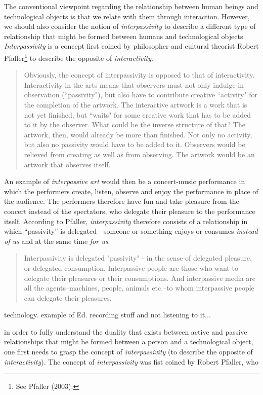The conventional viewpoint regarding the relationship between human beings and technological objects is that we relate with them through interaction. However, we should also consider the notion of \emph{interpassivity} to describe a different type of relationship that might be formed between humans and technological objects. \emph{Interpassivity} is a concept first coined by philosopher and cultural theorist Robert Pfaller\footnote{See Pfaller (2003).} to describe the opposite of \emph{interactivity}.
\begin{quote}
Obviously, the concept of interpassivity is opposed to that of interactivity. Interactivity in the arts means that observers must not only indulge in observation (``passivity"), but also have to contribute creative ``activity" for the completion of the artwork. The interactive artwork is a work that is not yet finished, but ``waits" for some creative work that has to be added to it by the observer. What could be the inverse structure of that? The artwork, then, would already be more than finished. Not only no activity, but also no passivity would have to be added to it. Observers would be relieved from creating as well as from observing. The artwork would be an artwork that observes itself.
\end{quote}
An example of \emph{interpassive art} would then be a concert-music performance in which the performers create, listen, observe and enjoy the performance in place of the audience. The performers therefore have fun and take pleasure from the concert instead of the spectators, who delegate their pleasure to the performance itself. According to Pfaller, \emph{interpassivity} therefore consists of a relationship in which ``passivity'' is delegated---someone or something enjoys or consumes \emph{instead of us} and at the same time \emph{for us}. 
\begin{quote}
Interpassivity is delegated "passivity" - in the sense of delegated pleasure, or delegated consumption. Interpassive people are those who want to delegate their pleasures or their consumptions. And interpassive media are all the agents--machines, people, animals etc.--to whom interpassive people can delegate their pleasures.
\end{quote}

technology. example of Ed. recording stuff and not listening to it...

in order to fully understand the duality that exists between active and passive relationships that might be formed between a person and a technological object, one first needs to grasp the concept of  \emph{interpassivity} (to describe the opposite of \emph{interactivity}). The concept of \emph{interpassivity} was fist coined by Robert Pfaller, who 

